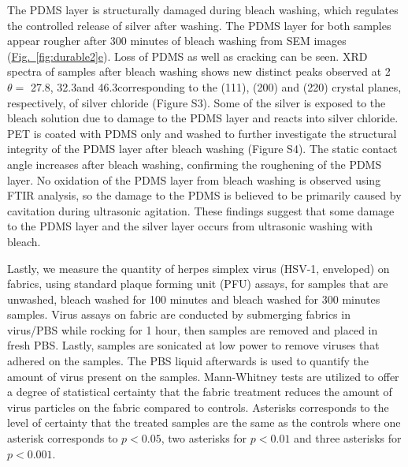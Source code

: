 \documentclass[journal=jacsat,manuscript=article]{achemso}
\newcommand{\figref}[2][]{\hyperref[#2]{Fig.~\ref{#2}#1}}
\begin{document}
The PDMS layer is structurally damaged during bleach washing, which regulates the controlled release of silver after washing. The PDMS layer for both samples appear rougher after 300 minutes of bleach washing from SEM images (\figref[e]{fig:durable2}). Loss of PDMS as well as cracking can be seen.  
XRD spectra of samples after bleach washing shows new distinct peaks observed at 2$\theta =$ 27.8\degree, 32.3\degree and 46.3\degree corresponding to the (111), (200) and (220) crystal planes, respectively, of silver chloride (Figure S3). 
Some of the silver is exposed to the bleach solution due to damage to the PDMS layer and reacts into silver chloride. %
PET is coated with PDMS only and washed to further investigate the structural integrity of the PDMS layer after bleach washing (Figure S4). The static contact angle increases after bleach washing, confirming the roughening of the PDMS layer. No oxidation of the PDMS layer from bleach washing is observed using FTIR analysis, so the damage to the PDMS is believed to be primarily caused by cavitation during ultrasonic agitation. These findings suggest that some damage to the PDMS layer and the silver layer occurs from ultrasonic washing with bleach.   

Lastly, we measure the quantity of herpes simplex virus (HSV-1, enveloped) on fabrics, using standard plaque forming unit (PFU) assays, for samples that are unwashed, bleach washed for 100 minutes and bleach washed for 300 minutes samples.
Virus assays on fabric are conducted by submerging fabrics in virus/PBS while rocking for 1 hour, then samples are removed and placed in fresh PBS. Lastly, samples are sonicated at low power to remove viruses that adhered on the samples. The PBS liquid afterwards is used to quantify the amount of virus present on the samples. Mann-Whitney tests are utilized to offer a degree of statistical certainty that the fabric treatment reduces the amount of virus particles on the fabric compared to controls. Asterisks corresponds to the level of certainty that the treated samples are the same as the controls where one asterisk corresponds to $p < 0.05$, two asterisks for $p < 0.01$ and three asterisks for $p < 0.001$.
\end{document}
